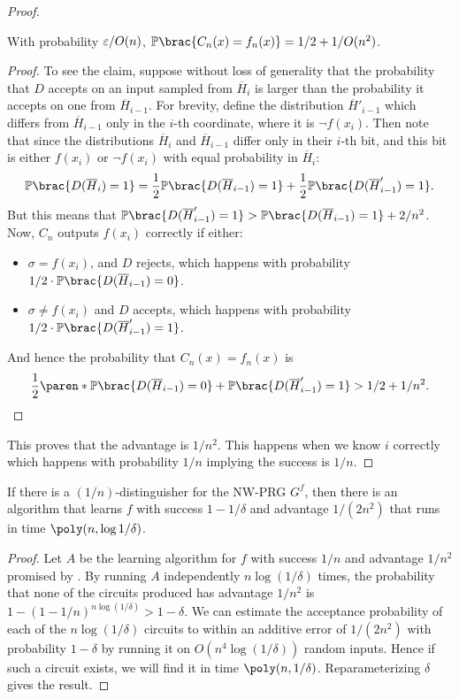 \begin{proof}
	\begin{claim}
		With probability $\varepsilon / O(n)$, $\Pr\brac{C_n(x) = f_n(x)} = 1/2 + 1/O(n^2)$.
	\end{claim}
	\begin{proof}
	To see the claim, suppose without loss of generality that the probability
	that $D$ accepts on an input sampled from $\overline{H}_{i}$ is larger
	than the probability it accepts on one from $\overline{H}_{i - 1}$.
	For brevity, define the distribution $\overline{H}'_{i - 1}$ which differs
	from $\overline{H}_{i - 1}$ only in the $i$-th coordinate, where it is
	$\lnot f(x_i)$.
	Then note that since the distributions $\overline{H}_i$ and
	$\overline{H}_{i - 1}$ differ only in their $i$-th bit, and this bit is
	either $f(x_i)$ or $\lnot f(x_i)$ with equal probability in
	$\overline{H}_i$:
	\[
	\Pr\brac{D(\overline{H}_{i}) = 1}
	= \frac 12 \Pr\brac{D(\overline{H}_{i - 1}) = 1}
	+ \frac 12 \Pr\brac{D(\overline{H}'_{i - 1}) = 1}.
	\]
	But this means that $\Pr\brac{D(\overline{H}'_{i - 1}) = 1} >
	\Pr\brac{D(\overline{H}_{i - 1}) = 1} + 2/n^2$.
	Now, $C_n$ outputs $f(x_i)$ correctly if either:
	\begin{itemize}
		\item $\sigma = f(x_i)$, and $D$ rejects, which happens with
		probability $1/2 \cdot \Pr\brac{D(\overline{H}_{i - 1}) = 0}$.
		\item $\sigma \neq f(x_i)$ and $D$ accepts, which happens with
		probability $1/2 \cdot \Pr\brac{D(\overline{H}'_{i - 1}) = 1}$.
	\end{itemize}
	And hence the probability that $C_n(x) = f_n(x)$ is
	\[
	\frac 12 \paren*{
		\Pr\brac{D(\overline{H}_{i - 1}) = 0} +
		\Pr\brac{D(\overline{H}'_{i - 1}) = 1}
	}
	> 1/2 + 1/n^2. \qedhere
	\]
	\end{proof}
	
This proves that the advantage is $1/n^2$. This happens when we know $i$ correctly which happens with probability $1/n$ implying the success is $1/n$.	
\end{proof}


\begin{corollary}\label{cor:learning-boost-success}
	If there is a $(1/n)$-distinguisher for the NW-PRG $G^f$, then there is an
	algorithm that learns $f$ with success $1 - 1/\delta$ and advantage
	$1/(2n^2)$ that runs in time $\poly(n, \log{1/\delta})$.
\end{corollary}

\begin{proof}
	Let $A$ be the learning algorithm for $f$ with success $1/n$ and advantage
	$1/n^2$ promised by . By running $A$
	independently $n \log(1/\delta)$ times, the probability that none of the
	circuits produced has advantage $1/n^2$ is $1 - (1 - 1/n)^{n\log(1/\delta)} >
	1 - \delta$. We can estimate the acceptance probability of each of the
	$n\log(1/\delta)$ circuits to within an additive error of $1/(2n^2)$ with
	probability $1 - \delta$ by running it on $O(n^4 \log(1/\delta))$ random
	inputs. Hence if such a circuit exists, we will find it in time $\poly(n,
	1/\delta)$. Reparameterizing $\delta$ gives the result.
\end{proof}


